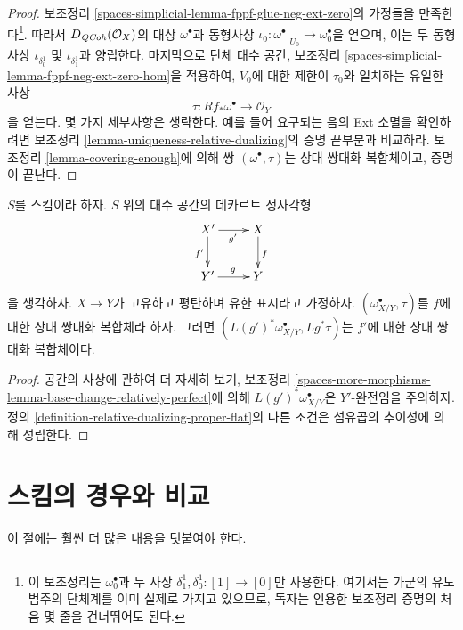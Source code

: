 \begin{proof}
보조정리 \ref{spaces-simplicial-lemma-fppf-glue-neg-ext-zero}의 가정들을
만족한다\footnote{이 보조정리는 $\omega_0^\bullet$과 두 사상
$\delta_1^1, \delta_0^1 : [1] \to [0]$만 사용한다. 여기서는 가군의
유도 범주의 단체계를 이미 실제로 가지고 있으므로, 독자는 인용한
보조정리 증명의 처음 몇 줄을 건너뛰어도 된다.}.
따라서 $D_{\mathit{QCoh}}(\mathcal{O}_X)$의 대상 $\omega^\bullet$과 동형사상
$\iota_0 : \omega^\bullet|_{U_0} \to \omega_0^\bullet$을 얻으며, 이는
두 동형사상 $\iota_{\delta^1_0}$ 및 $\iota_{\delta^1_1}$과 양립한다.
마지막으로 단체 대수 공간, 보조정리
\ref{spaces-simplicial-lemma-fppf-neg-ext-zero-hom}을 적용하여, $V_0$에
대한 제한이 $\tau_0$와 일치하는 유일한 사상
$$
\tau : Rf_*\omega^\bullet \longrightarrow \mathcal{O}_Y
$$
을 얻는다. 몇 가지 세부사항은 생략한다.
예를 들어 요구되는 음의 Ext 소멸을 확인하려면 보조정리
\ref{lemma-uniqueness-relative-dualizing}의 증명 끝부분과 비교하라.
보조정리 \ref{lemma-covering-enough}에 의해 쌍
$(\omega^\bullet, \tau)$는 상대 쌍대화 복합체이고, 증명이 끝난다.
\end{proof}

\begin{lemma}
\label{lemma-base-change-relative-dualizing}
$S$를 스킴이라 하자. $S$ 위의 대수 공간의 데카르트 정사각형
$$
\xymatrix{
X' \ar[d]_{f'} \ar[r]_{g'} & X \ar[d]^f \\
Y' \ar[r]^g & Y
}
$$
을 생각하자. $X \to Y$가 고유하고 평탄하며 유한 표시라고 가정하자.
$(\omega_{X/Y}^\bullet, \tau)$를 $f$에 대한 상대 쌍대화 복합체라 하자.
그러면 $(L(g')^*\omega_{X/Y}^\bullet, Lg^*\tau)$는 $f'$에 대한 상대
쌍대화 복합체이다.
\end{lemma}

\begin{proof}
공간의 사상에 관하여 더 자세히 보기, 보조정리
\ref{spaces-more-morphisms-lemma-base-change-relatively-perfect}에 의해
$L(g')^*\allowbreak\omega_{X/Y}^\bullet$은 $Y'$-완전임을 주의하자. 정의
\ref{definition-relative-dualizing-proper-flat}의 다른 조건은 섬유곱의
추이성에 의해 성립한다.
\end{proof}

\section{스킴의 경우와 비교}
\label{section-comparison}

\noindent
이 절에는 훨씬 더 많은 내용을 덧붙여야 한다.

